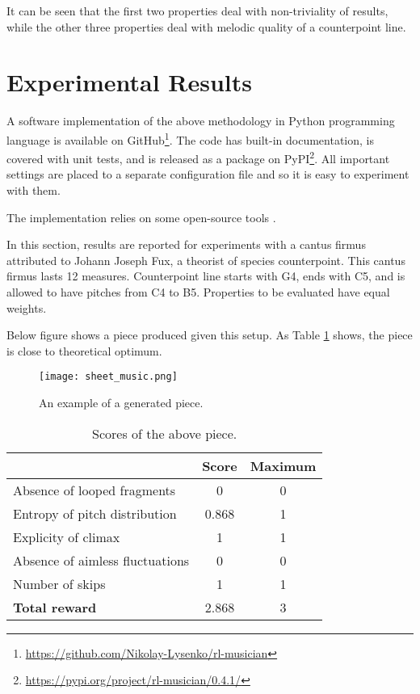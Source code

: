\documentclass{article}
\begin{document}
It can be seen that the first two properties deal with non-triviality of results, while the other three properties deal with melodic quality of a counterpoint line. 


\section{Experimental Results}
\label{sec:results}

A software implementation of the above methodology in Python programming language is available on GitHub\footnote{\url{https://github.com/Nikolay-Lysenko/rl-musician}}. The code has built-in documentation, is covered with unit tests, and is released as a package on PyPI\footnote{\url{https://pypi.org/project/rl-musician/0.4.1/}}. All important settings are placed to a separate configuration file and so it is easy to experiment with them.

The implementation relies on some open-source tools \cite{brockman2016openai,oliphant2006guide,raffel2014intuitive}.

In this section, results are reported for experiments with a cantus firmus attributed to Johann Joseph Fux, a theorist of species counterpoint. This cantus firmus lasts 12 measures. Counterpoint line starts with G4, ends with C5, and is allowed to have pitches from C4 to B5. Properties to be evaluated have equal weights.

Below figure shows a piece produced given this setup. As Table \ref{table:scores} shows, the piece is close to theoretical optimum.

\begin{figure}[h!]
	\label{image:sheet}
	\caption{An example of a generated piece.}
	\centering
	\texttt{[image: sheet\_music.png]}
\end{figure}

\begin{table}[h!]
	\caption{Scores of the above piece.}
	\label{table:scores}
	\begin{center}
		\begin{tabular}{|l|c|c|}
			\hline
			& Score & Maximum\\
			\hline
			Absence of looped fragments & 0 & 0\\
			\hline
			Entropy of pitch distribution & 0.868 & 1\\
			\hline
			Explicity of climax & 1 & 1\\
			\hline
			Absence of aimless fluctuations & 0 & 0\\
			\hline
			Number of skips & 1 & 1\\
			\hline
			\textbf{Total reward} & 2.868 & 3\\
			\hline
		\end{tabular}
	\end{center}
\end{table}
\end{document}
